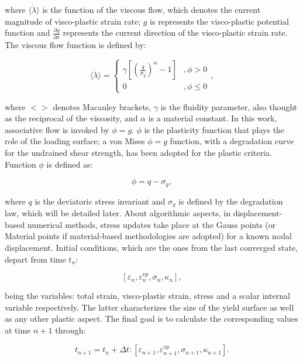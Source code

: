 \documentclass[applsci,journal,article,submit,moreauthors,pdftex]{Definitions/mdpi}
\begin{document}
where  $\langle \dot{\lambda}\rangle$ is the function of the viscous flow, which denotes the current magnitude of visco-plastic strain rate; $g$ is represents the visco-plastic potential function and  $\frac{\partial g}{\partial \sigma}$ represents the current direction of the visco-plastic strain rate. The viscous flow function is defined by:

\begin{equation}
\langle \dot{\lambda}\rangle=\left\{\begin{array}{cl}\gamma\left[\left(\frac{q}{\sigma_y}\right)^\alpha-1\right] & , \phi>0 \\ 0 & , \phi \leq 0\end{array}\right. ,
\end{equation}


where $<>$ denotes Macauley brackets, $\gamma$ is the fluidity parameter, also thought as the reciprocal of the viscosity, and $\alpha$ is a material constant. In this work, associative flow is invoked by $\phi=g$. $\phi$ is the plasticity function that plays the role of the loading surface; a von Mises $\phi=g$ function, with a degradation curve for the undrained shear strength, has been adopted for the plastic criteria. Function $\phi$ is defined as:

\begin{equation}
\phi=q-\sigma_y,
\end{equation}

where $q$ is the deviatoric stress invariant and $\sigma_y$ is defined by the degradation law, which will be detailed later. About algorithmic aspects, in displacement-based numerical methods, stress updates take place at the Gauss points (or Material points if material-based methodologies are adopted) for a known nodal displacement. Initial conditions, which are the ones from the last converged state,  depart from time $t_{n}$: 

\begin{equation}
\left[\varepsilon_{n}, \varepsilon_{n}^{v p}, \sigma_{n}, \kappa_{n}\right],
\end{equation}

being the variables: total strain, visco-plastic strain, stress and a scalar internal variable respectively. The latter characterizes the size of the yield surface as well as any other plastic aspect. The final goal is to calculate the corresponding values at time $n+1$ through:

\begin{equation}
t_{n+1}=t_{n}+\Delta t:\left[\varepsilon_{n+1}, \varepsilon_{n+1}^{v p}, \sigma_{n+1}, \kappa_{n+1}\right].
\end{equation}
\end{document}
